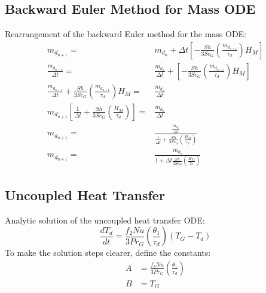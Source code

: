 \documentclass[../Interim_Report_Master]{subfiles}
\begin{document}
\subsection{Backward Euler Method for Mass ODE}\label{back_euler_mass_dev}
Rearrangement of the backward Euler method for the mass ODE:
\begin{subequations}
\begin{align}
m_{d_{n+1}} =& m_{d_{n}} + \Delta t \left[-\frac{Sh}{3Sc_{G}}\left(\frac{m_{d_{n+1}}}{\tau_{d}}\right)H_M\right] \\
\frac{m_{d_{n+1}}}{\Delta t} =& \frac{m_{d_{n}}}{\Delta t}+  \left[-\frac{Sh}{3Sc_{G}}\left(\frac{m_{d_{n+1}}}{\tau_{d}}\right)H_M\right] \\
\frac{m_{d_{n+1}}}{\Delta t} + \frac{Sh}{3Sc_{G}}\left(\frac{m_{d_{n+1}}}{\tau_{d}}\right)H_M =& \frac{m_{d_{n}}}{\Delta t} \\
m_{d_{n+1}}\left[\frac{1}{\Delta t} + \frac{Sh}{3Sc_{G}}\left(\frac{H_M}{\tau_{d}}\right)\right] =& \frac{m_{d_{n}}}{\Delta t} \\
m_{d_{n+1}} =& \frac{\frac{m_{d_{n}}}{\Delta t}}{\frac{1}{\Delta t} + \frac{Sh}{3Sc_{G}}\left(\frac{H_M}{\tau_{d}}\right)} \\
m_{d_{n+1}} =& \frac{m_{d_{n}}}{1+ \Delta t\frac{Sh}{3Sc_{G}}\left(\frac{H_M}{\tau_{d}}\right)} 
\end{align}
\end{subequations}

\subsection{Uncoupled Heat Transfer}\label{uc_heat_dev}
Analytic solution of the uncoupled heat transfer ODE:
\begin{equation}
\frac{dT_{d}}{dt} = \frac{f_{2}Nu}{3Pr_{G}}\left(\frac{\theta_1}{\tau_d}\right)(T_{G}-T_{d})
\end{equation}
To make the solution steps clearer, define the constants:
\begin{subequations}
\begin{align}
A &= \frac{f_{2}Nu}{3Pr_{G}}\left(\frac{\theta_1}{\tau_d}\right) \\
B &= T_G
\end{align}
\end{subequations}
\end{document}
